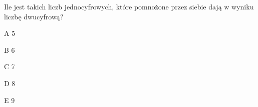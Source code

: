\begin{tresc}
Ile jest takich liczb jednocyfrowych, które pomnożone przez siebie dają w wyniku liczbę dwucyfrową?
\end{tresc}
\begin{wariant}{A} 5 \end{wariant}
\begin{wariant}{B} 6 \end{wariant}
\begin{wariant}{C} 7 \end{wariant}
\begin{wariant}{D} 8 \end{wariant}
\begin{wariant}{E} 9 \end{wariant}
